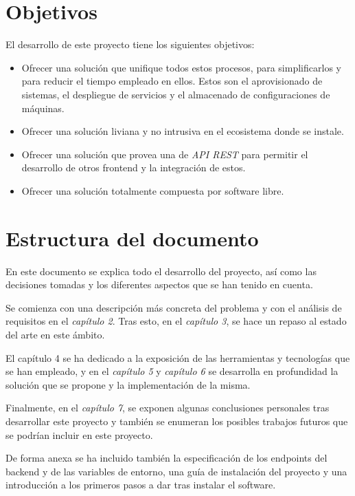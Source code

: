 \section{Objetivos}

El desarrollo de este proyecto tiene los siguientes objetivos:

\begin{itemize}
\item Ofrecer una solución que unifique todos estos procesos, para simplificarlos y para reducir el tiempo empleado en ellos. Estos son el aprovisionado de sistemas, el despliegue de servicios y el almacenado de configuraciones de máquinas.
\item Ofrecer una solución liviana y no intrusiva en el ecosistema donde se instale.
\item Ofrecer una solución que provea una de \textit{API REST} para permitir el desarrollo de otros frontend y la integración de estos.
\item Ofrecer una solución totalmente compuesta por software libre.
\end{itemize}

\section{Estructura del documento}

En este documento se explica todo el desarrollo del proyecto, así como las decisiones tomadas y los diferentes aspectos que se han tenido en cuenta.

Se comienza con una descripción más concreta del problema y con el análisis de requisitos en el \textit{capítulo 2}. Tras esto, en el \textit{capítulo 3}, se hace un repaso al estado del arte en este ámbito.

El capítulo 4 se ha dedicado a la exposición de las herramientas y tecnologías que se han empleado, y en el \textit{capítulo 5} y \textit{capítulo 6} se desarrolla en profundidad la solución que se propone y la implementación de la misma.

Finalmente, en el \textit{capítulo 7}, se exponen algunas conclusiones personales tras desarrollar este proyecto y también se enumeran los posibles trabajos futuros que se podrían incluir en este proyecto.

De forma anexa se ha incluido también la especificación de los endpoints del backend y de las variables de entorno, una guía de instalación del proyecto y una introducción a los primeros pasos a dar tras instalar el software.